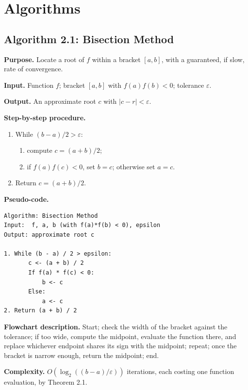 \documentclass[
]{article}
\providecommand{\tightlist}{%
  \setlength{\itemsep}{0pt}\setlength{\parskip}{0pt}}
\begin{document}
\section{Algorithms}\label{algorithms}

\subsection{Algorithm 2.1: Bisection
Method}\label{algorithm-2.1-bisection-method}

\textbf{Purpose.} Locate a root of \(f\) within a bracket \([a,b]\),
with a guaranteed, if slow, rate of convergence.

\textbf{Input.} Function \(f\); bracket \([a,b]\) with \(f(a)f(b)<0\);
tolerance \(\varepsilon\).

\textbf{Output.} An approximate root \(c\) with \(|c-r| < \varepsilon\).

\textbf{Step-by-step procedure.}

\begin{enumerate}
\def\labelenumi{\arabic{enumi}.}
\tightlist
\item
  While \((b-a)/2 > \varepsilon\):

  \begin{enumerate}
  \def\labelenumii{(\alph{enumii})}
  \tightlist
  \item
    compute \(c=(a+b)/2\);
  \item
    if \(f(a)f(c) < 0\), set \(b=c\); otherwise set \(a=c\).
  \end{enumerate}
\item
  Return \(c=(a+b)/2\).
\end{enumerate}

\textbf{Pseudo-code.}

\begin{verbatim}
Algorithm: Bisection Method
Input:  f, a, b (with f(a)*f(b) < 0), epsilon
Output: approximate root c

1. While (b - a) / 2 > epsilon:
       c <- (a + b) / 2
       If f(a) * f(c) < 0:
           b <- c
       Else:
           a <- c
2. Return (a + b) / 2
\end{verbatim}

\textbf{Flowchart description.} Start; check the width of the bracket
against the tolerance; if too wide, compute the midpoint, evaluate the
function there, and replace whichever endpoint shares its sign with the
midpoint; repeat; once the bracket is narrow enough, return the
midpoint; end.

\textbf{Complexity.} \(O(\log_2((b-a)/\varepsilon))\) iterations, each
costing one function evaluation, by Theorem 2.1.
\end{document}
